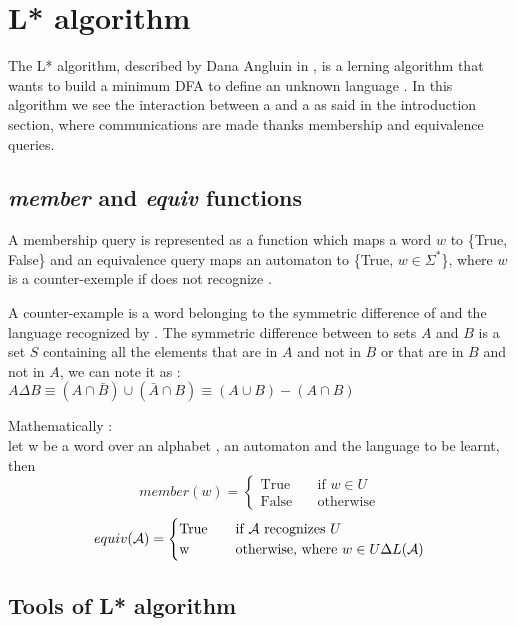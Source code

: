 \section{L* algorithm}

The L* algorithm, described by Dana Angluin in \cite{angluinL}, is a lerning algorithm that wants to build a minimum DFA to define an unknown language \langU{}. In this algorithm we see the interaction between a \lerner{} and a \teacher{} as said in the introduction section, where communications are made thanks membership and equivalence queries.

\subsection{\textit{member} and \textit{equiv} functions}

A membership query is represented as a function which maps a word $w$ to \{True, False\} and an equivalence query maps an automaton \automaton{} to \{True, $w \in \Sigma^*$\}, where $w$ is a counter-exemple if \automaton{} does not recognize \langU{}.

A counter-example is a word belonging to the symmetric difference of \langU{} and the language recognized by \automaton{}. The symmetric difference between to sets $A$ and $B$ is a set $S$ containing all the elements that are in $A$ and not in $B$ or that are in $B$ and not in $A$, we can note it as : $A \Delta B \equiv (A \cap \bar{B}) \cup (\bar{A} \cap B) \equiv (A \cup B) - (A \cap B) $

Mathematically :\\
let w be a word over an alphabet \alphabet{}, \automaton{} an automaton and \langU{} the language to be learnt, then
\[ member(w) =
  \begin{cases}
    \text{True}  & \quad \text{if } w \in U \\
    \text{False} & \quad \text{otherwise}
  \end{cases}
\]
\[ equiv(\mathcal{A}{}) =
  \begin{cases}
    \text{True} & \quad \text{if } \mathcal{A}{} \text{ recognizes } U           \\
    \text{w}    & \quad \text{otherwise, where } w \in U \Delta L(\mathcal{A}{})
  \end{cases}
\]

\subsection{Tools of L* algorithm}

